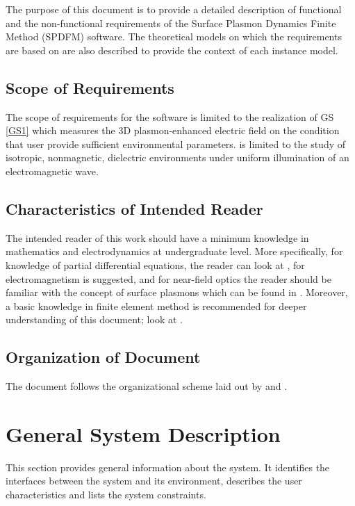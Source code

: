 \documentclass[12pt]{article}
\begin{document}
	The purpose of this document is to provide a detailed description of functional
	and the non-functional requirements of the Surface Plasmon Dynamics Finite
	Method (SPDFM) software. The theoretical models on which the requirements are
	based on are also described to provide the context of each instance model.
	
	\subsection{Scope of Requirements}
	
	The scope of requirements for the software \progname{} is limited to the
	realization of GS \ref{GS1} which measures the 3D plasmon-enhanced electric
	field on the condition that user provide sufficient environmental parameters.
	\progname{} is limited to the study of isotropic, nonmagnetic, dielectric
	environments under uniform illumination of an electromagnetic wave.
	
	\subsection{Characteristics of Intended Reader} \label{sec_IntendedReader} The
	intended reader of this work should have a minimum knowledge in mathematics and
	electrodynamics at undergraduate level. More specifically, for knowledge of
	partial differential equations, the reader can look at
	\cite{boyce2012elementary}, for electromagnetism
	\cite{griffiths1962introduction} is suggested, and for near-field optics the
	reader should be familiar with the concept of surface plasmons  which can be
	found in \cite{maier2007plasmonics}. Moreover, a basic knowledge in finite
	element method is recommended for deeper understanding of this document; look
	at \cite{monk2003finite}.
	
	
	\subsection{Organization of Document}
	
	The document follows the organizational scheme laid out by
	\cite{SmithAndLai2005} and  \cite{SmithEtAl2007}.
	
	
	\section{General System Description}
	
	This section provides general information about the system.  It identifies the
	interfaces between the system and its environment, describes the user
	characteristics and lists the system constraints.
	
\end{document}

